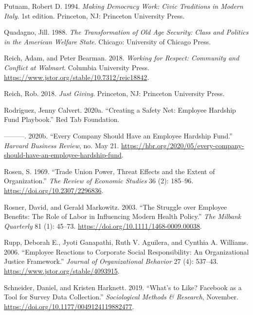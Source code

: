 \documentclass[
  11pt,
  oneside]{article}
\newlength{\cslhangindent}
\newenvironment{CSLReferences}[2] %
 {\begin{list}{}{%
  \setlength{\itemindent}{0pt}
  \setlength{\leftmargin}{0pt}
  \setlength{\parsep}{0pt}
  \ifodd #1
   \setlength{\leftmargin}{\cslhangindent}
   \setlength{\itemindent}{-1\cslhangindent}
  \fi
  \setlength{\itemsep}{#2\baselineskip}}}
 {\end{list}}
\begin{document}
\begin{CSLReferences}{1}{0}
Putnam, Robert D. 1994. \emph{Making {Democracy} {Work}: {Civic} {Traditions} in {Modern} {Italy}}. 1st edition. Princeton, NJ: Princeton University Press.

Quadagno, Jill. 1988. \emph{The {Transformation} of {Old} {Age} {Security}: {Class} and {Politics} in the {American} {Welfare} {State}}. Chicago: University of Chicago Press.

Reich, Adam, and Peter Bearman. 2018. \emph{Working for {Respect}: {Community} and {Conflict} at {Walmart}}. Columbia University Press. \url{https://www.jstor.org/stable/10.7312/reic18842}.

Reich, Rob. 2018. \emph{Just {Giving}}. Princeton, NJ: Princeton University Press.

Rodriguez, Jenny Calvert. 2020a. {``Creating a {Safety} {Net}: {Employee} {Hardship} {Fund} {Playbook}.''} Red Tab Foundation.

---------. 2020b. {``Every {Company} {Should} {Have} an {Employee} {Hardship} {Fund}.''} \emph{Harvard Business Review}, no. May 21. \url{https://hbr.org/2020/05/every-company-should-have-an-employee-hardship-fund}.

Rosen, S. 1969. {``Trade {Union Power}, {Threat Effects} and the {Extent} of {Organization}.''} \emph{The Review of Economic Studies} 36 (2): 185--96. \url{https://doi.org/10.2307/2296836}.

Rosner, David, and Gerald Markowitz. 2003. {``The {Struggle} over {Employee} {Benefits}: {The} {Role} of {Labor} in {Influencing} {Modern} {Health} {Policy}.''} \emph{The Milbank Quarterly} 81 (1): 45--73. \url{https://doi.org/10.1111/1468-0009.00038}.

Rupp, Deborah E., Jyoti Ganapathi, Ruth V. Aguilera, and Cynthia A. Williams. 2006. {``Employee {Reactions} to {Corporate Social Responsibility}: {An Organizational Justice Framework}.''} \emph{Journal of Organizational Behavior} 27 (4): 537--43. \url{https://www.jstor.org/stable/4093915}.

Schneider, Daniel, and Kristen Harknett. 2019. {``What's to {Like}? {Facebook} as a {Tool} for {Survey} {Data} {Collection}.''} \emph{Sociological Methods \& Research}, November. \url{https://doi.org/10.1177/0049124119882477}.


\end{CSLReferences}
\end{document}
